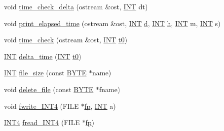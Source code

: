 \begin{DoxyCompactItemize}
\item 
void \mbox{\hyperlink{util_8_c_aeb25eb3cbc89e1cd314f4a0fba55779b}{time\+\_\+check\+\_\+delta}} (ostream \&ost, \mbox{\hyperlink{galois_8h_a09fddde158a3a20bd2dcadb609de11dc}{I\+NT}} dt)
\item 
void \mbox{\hyperlink{util_8_c_a92d16200f8fa968b259ca347e3549244}{print\+\_\+elapsed\+\_\+time}} (ostream \&ost, \mbox{\hyperlink{galois_8h_a09fddde158a3a20bd2dcadb609de11dc}{I\+NT}} \mbox{\hyperlink{simeon_8_c_a4339ca06fa882e69473d37bd6d7917d1}{d}}, \mbox{\hyperlink{galois_8h_a09fddde158a3a20bd2dcadb609de11dc}{I\+NT}} \mbox{\hyperlink{alphabet2_8_c_a16611451551e3d15916bae723c3f59f7}{h}}, \mbox{\hyperlink{galois_8h_a09fddde158a3a20bd2dcadb609de11dc}{I\+NT}} m, \mbox{\hyperlink{galois_8h_a09fddde158a3a20bd2dcadb609de11dc}{I\+NT}} s)
\item 
void \mbox{\hyperlink{util_8_c_a3e54f7e5a0326bf4b3de456ef318e9db}{time\+\_\+check}} (ostream \&ost, \mbox{\hyperlink{galois_8h_a09fddde158a3a20bd2dcadb609de11dc}{I\+NT}} \mbox{\hyperlink{translation__plane__main_8_c_a4268f4fe222ffb119218a0199f5e1904}{t0}})
\item 
\mbox{\hyperlink{galois_8h_a09fddde158a3a20bd2dcadb609de11dc}{I\+NT}} \mbox{\hyperlink{util_8_c_aba5a9b4461d821d782f03b5665db1934}{delta\+\_\+time}} (\mbox{\hyperlink{galois_8h_a09fddde158a3a20bd2dcadb609de11dc}{I\+NT}} \mbox{\hyperlink{translation__plane__main_8_c_a4268f4fe222ffb119218a0199f5e1904}{t0}})
\item 
\mbox{\hyperlink{galois_8h_a09fddde158a3a20bd2dcadb609de11dc}{I\+NT}} \mbox{\hyperlink{util_8_c_a5c37cf5785204b6e9adf647dc14d0e50}{file\+\_\+size}} (const \mbox{\hyperlink{galois_8h_ab6cc7b4aeb6ea31aba2b3fbfc83ff5e6}{B\+Y\+TE}} $\ast$name)
\item 
void \mbox{\hyperlink{util_8_c_a94541673208a86d2de8a85c5cd3f29da}{delete\+\_\+file}} (const \mbox{\hyperlink{galois_8h_ab6cc7b4aeb6ea31aba2b3fbfc83ff5e6}{B\+Y\+TE}} $\ast$fname)
\item 
void \mbox{\hyperlink{util_8_c_a2e1091b3187c01029a1a1453ce9e8639}{fwrite\+\_\+\+I\+N\+T4}} (F\+I\+LE $\ast$\mbox{\hyperlink{k__arc__lifting_8_c_a67cc9fbd0817c2d140368e5ed1f2a44d}{fp}}, \mbox{\hyperlink{galois_8h_a09fddde158a3a20bd2dcadb609de11dc}{I\+NT}} a)
\item 
\mbox{\hyperlink{galois_8h_a6675ac57b948be915e03c09228b57b05}{I\+N\+T4}} \mbox{\hyperlink{util_8_c_a885df02c08251c103e985ef1d7159014}{fread\+\_\+\+I\+N\+T4}} (F\+I\+LE $\ast$\mbox{\hyperlink{k__arc__lifting_8_c_a67cc9fbd0817c2d140368e5ed1f2a44d}{fp}})
\item 

\end{DoxyCompactItemize}
